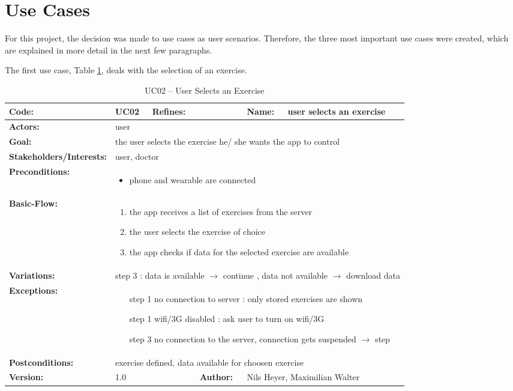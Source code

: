 \section{Use Cases}
For this project, the decision was made to use cases as user scenarios. Therefore, the three most important use cases were created, which are explained in more detail in the next few paragraphs.


The first use case, Table \ref{tab:1}, deals with the selection of an exercise.
\begin{table}[H]
	\begin{tabular}{|l|l|l|l|l|l|} \hline
		\textbf{Code:} & UC02 & \textbf{Refines:} &  & \textbf{Name:} & user selects an exercise \\ \hline
		\textbf{Actors:} & \multicolumn{5}{l|}{user} \\ \hline
		\textbf{Goal:} & \multicolumn{5}{l|}{the user selects the exercise he/ she wants the app to control} \\ \hline
		\textbf{Stakeholders/Interests:} & \multicolumn{5}{l|}{user, doctor} \\ \hline
		\textbf{Preconditions:} & \multicolumn{5}{l|}{\parbox{0.75\textwidth}{
			\begin{itemize}
				\item phone and wearable are connected
			\end{itemize}
		}} \\ \hline
		\textbf{Basic-Flow:} & \multicolumn{5}{l|}{\parbox{0.75\textwidth}{
			\begin{enumerate}
				\item the app receives a list of exercises from the server
				\item the user selects the exercise of choice
				\item the app checks if data for the selected exercise are available
			\end{enumerate}
		}} \\ \hline
		\textbf{Variations:} & \multicolumn{5}{l|}{
			step 3 : data is available $\rightarrow$ continue , data not available  $\rightarrow$ download data
		} \\ \hline
		\textbf{Exceptions:} & \multicolumn{5}{l|}{\parbox{0.75\textwidth}{
			\begin{itemize}[leftmargin=1.55cm]
				\item[step 1] no connection to server :  only stored exercises are shown
				\item[step 1] wifi/3G disabled  : ask user to turn on wifi/3G
				\item[step 3] no connection to the server, connection gets suspended $\rightarrow$ step
			\end{itemize}
		}} \\ \hline
		\textbf{Postconditions:} & \multicolumn{5}{l|}{exercise defined, data available for choosen exercise} \\ \hline
		\textbf{Version:} & \multicolumn{2}{l|}{1.0} & \textbf{Author:} & \multicolumn{2}{l|}{Nils Heyer, Maximilian Walter} \\ \hline
	\end{tabular}
	\caption{UC02 -- User Selects an Exercise}
	\label{tab:1}
\end{table}
